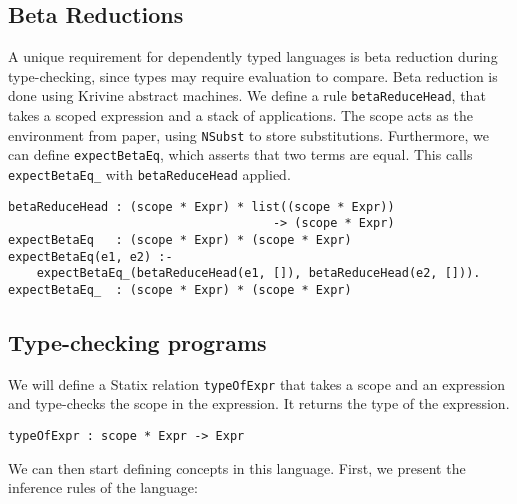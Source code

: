 \documentclass[a4paper,UKenglish,cleveref, autoref, thm-restate]{oasics-v2021}
\begin{document}
\subsection{Beta Reductions}

A unique requirement for dependently typed languages is beta reduction during type-checking, since types may require evaluation to compare. Beta reduction is done using Krivine abstract machines\cite{krivine}. We define a rule \verb|betaReduceHead|, that takes a scoped expression and a stack of applications. The scope acts as the environment from \cite{krivine} paper, using \verb|NSubst| to store substitutions. Furthermore, we can define \verb|expectBetaEq|, which asserts that two terms are equal. This calls \verb|expectBetaEq_| with \verb|betaReduceHead| applied.

\begin{lstlisting}
betaReduceHead : (scope * Expr) * list((scope * Expr))
                                     -> (scope * Expr)
expectBetaEq   : (scope * Expr) * (scope * Expr)
expectBetaEq(e1, e2) :- 
    expectBetaEq_(betaReduceHead(e1, []), betaReduceHead(e2, [])).
expectBetaEq_  : (scope * Expr) * (scope * Expr)
\end{lstlisting}	

\subsection{Type-checking programs}

We will define a Statix relation \verb|typeOfExpr| that takes a scope and an expression and type-checks the scope in the expression. It returns the type of the expression.

\begin{lstlisting}
typeOfExpr : scope * Expr -> Expr
\end{lstlisting}


We can then start defining concepts in this language. First, we present the inference rules of the language:
\end{document}
